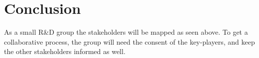 \section{Conclusion}
As a small R\&D group the stakeholders will be mapped as seen above. To get a collaborative process, the group will need the consent of the key-players, and keep the other stakeholders informed as well. 

